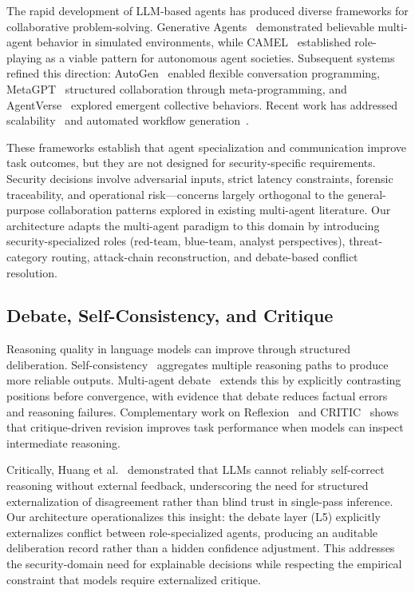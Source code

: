 The rapid development of LLM-based agents has produced diverse frameworks for collaborative problem-solving. Generative Agents~\cite{park2023generative} demonstrated believable multi-agent behavior in simulated environments, while CAMEL~\cite{li2023camel} established role-playing as a viable pattern for autonomous agent societies. Subsequent systems refined this direction: AutoGen~\cite{wu2024autogen} enabled flexible conversation programming, MetaGPT~\cite{hong2024metagpt} structured collaboration through meta-programming, and AgentVerse~\cite{chen2024agentverse} explored emergent collective behaviors. Recent work has addressed scalability~\cite{qian2025scaling} and automated workflow generation~\cite{zhang2025aflow}.

These frameworks establish that agent specialization and communication improve task outcomes, but they are not designed for security-specific requirements. Security decisions involve adversarial inputs, strict latency constraints, forensic traceability, and operational risk---concerns largely orthogonal to the general-purpose collaboration patterns explored in existing multi-agent literature. Our architecture adapts the multi-agent paradigm to this domain by introducing security-specialized roles (red-team, blue-team, analyst perspectives), threat-category routing, attack-chain reconstruction, and debate-based conflict resolution.

\subsection{Debate, Self-Consistency, and Critique}
\label{subsec:debate}

Reasoning quality in language models can improve through structured deliberation. Self-consistency~\cite{wang2023selfconsistency} aggregates multiple reasoning paths to produce more reliable outputs. Multi-agent debate~\cite{du2024debate} extends this by explicitly contrasting positions before convergence, with evidence that debate reduces factual errors and reasoning failures. Complementary work on Reflexion~\cite{shinn2023reflexion} and CRITIC~\cite{gou2024critic} shows that critique-driven revision improves task performance when models can inspect intermediate reasoning.

Critically, Huang et al.~\cite{huang2024selfcorrect} demonstrated that LLMs cannot reliably self-correct reasoning without external feedback, underscoring the need for structured externalization of disagreement rather than blind trust in single-pass inference. Our architecture operationalizes this insight: the debate layer (L5) explicitly externalizes conflict between role-specialized agents, producing an auditable deliberation record rather than a hidden confidence adjustment. This addresses the security-domain need for explainable decisions while respecting the empirical constraint that models require externalized critique.


